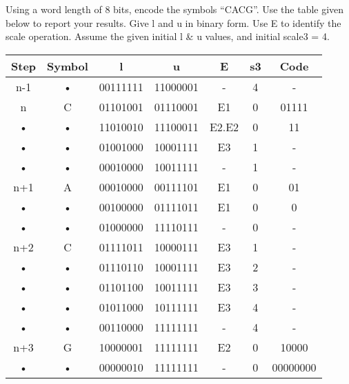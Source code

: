 \begin{question}
Using a word length of 8 bits, encode the symbols “CACG”. Use the table given below to report your results. Give l and u in binary form. Use E to identify the scale operation. Assume the given initial l \& u values, and initial scale3 = 4.
\end{question}
\begin{solution}
\begin{tabular}{|c|c|c|c|c|c|c|}
\hline 
Step & Symbol & l & u & E & s3 & Code \\ 
\hline 
n-1 & • & 00111111 & 11000001 & - & 4 & - \\ 
\hline 
n & C & 01101001 & 01110001 & E1 & 0 & 01111 \\ 
\hline 
• & • & 11010010 & 11100011 & E2.E2 & 0 & 11 \\ 
\hline 
• & • & 01001000 & 10001111 & E3 & 1 & - \\ 
\hline 
• & • & 00010000 & 10011111 & - & 1 & - \\ 
\hline 
n+1 & A & 00010000 & 00111101 & E1 & 0 & 01 \\ 
\hline 
• & • & 00100000 & 01111011 & E1 & 0 & 0 \\ 
\hline 
• & • & 01000000 & 11110111 & - & 0 & - \\ 
\hline 
n+2 & C & 01111011 & 10000111 & E3 & 1 & - \\ 
\hline 
• & • & 01110110 & 10001111 & E3 & 2 & - \\ 
\hline 
• & • & 01101100 & 10011111 & E3 & 3 & - \\ 
\hline 
• & • & 01011000 & 10111111 & E3 & 4 & - \\ 
\hline 
• & • & 00110000 & 11111111 & - & 4 & - \\ 
\hline 
n+3 & G & 10000001 & 11111111 & E2 & 0 & 10000 \\ 
\hline 
• & • & 00000010 & 11111111 & - & 0 & 00000000 \\ 
\hline 
\end{tabular} 
\end{solution}

